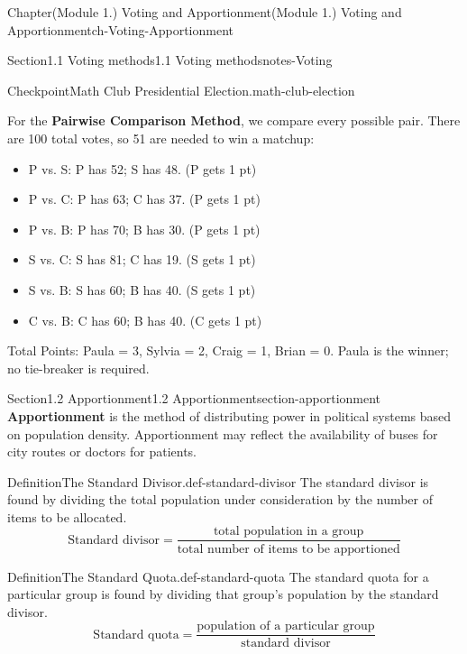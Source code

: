 \documentclass[oneside,10pt,]{book}
\newcommand{\ptxlistdisc}{\raisebox{0.3ex}{\textbullet}}
\newcommand{\terminology}[1]{\textbf{#1}}
\begin{document}
\begin{chapterptx}{Chapter}{(Module 1.) Voting and Apportionment}{}{(Module 1.) Voting and Apportionment}{}{}{ch-Voting-Apportionment}
\begin{sectionptx}{Section}{1.1 Voting methods}{}{1.1 Voting methods}{}{}{notes-Voting}
\begin{inlineexercise}{Checkpoint}{Math Club Presidential Election.}{math-club-election}
\begin{enumerate}[label={\arabic*}]
\par
For the \terminology{Pairwise Comparison Method}, we compare every possible pair. There are 100 total votes, so 51 are needed to win a matchup:%
\begin{itemize}[label=\ptxlistdisc]
\item{}P vs. S: P has 52; S has 48. (P gets 1 pt)%
\item{}P vs. C: P has 63; C has 37. (P gets 1 pt)%
\item{}P vs. B: P has 70; B has 30. (P gets 1 pt)%
\item{}S vs. C: S has 81; C has 19. (S gets 1 pt)%
\item{}S vs. B: S has 60; B has 40. (S gets 1 pt)%
\item{}C vs. B: C has 60; B has 40. (C gets 1 pt)%
\end{itemize}
%
\par
Total Points: Paula = 3, Sylvia = 2, Craig = 1, Brian = 0. Paula is the winner; no tie-breaker is required.%
\end{enumerate}
%
\end{inlineexercise}%
\end{sectionptx}
%
%
\typeout{************************************************}
\typeout{************************************************}
%
\begin{sectionptx}{Section}{1.2 Apportionment}{}{1.2 Apportionment}{}{}{section-apportionment}
\terminology{Apportionment} is the method of distributing power in political systems based on population density. Apportionment may reflect the availability of buses for city routes or doctors for patients.%
\begin{definition}{Definition}{The Standard Divisor.}{def-standard-divisor}%
The standard divisor is found by dividing the total population under consideration by the number of items to be allocated.%
%
\begin{equation*}
\text{Standard divisor} = \frac{\text{total population in a group}}{\text{total number of items to be apportioned}}
\end{equation*}
\end{definition}
\begin{definition}{Definition}{The Standard Quota.}{def-standard-quota}%
The standard quota for a particular group is found by dividing that group's population by the standard divisor.%
%
\begin{equation*}
\text{Standard quota} = \frac{\text{population of a particular group}}{\text{standard divisor}}

\end{equation*}
\end{definition}
\end{sectionptx}
\end{chapterptx}
\end{document}
